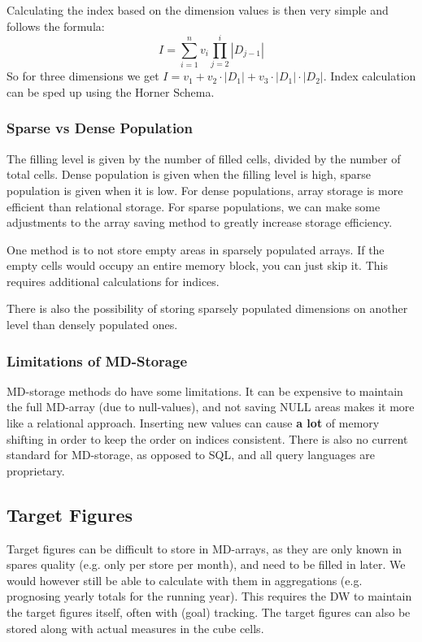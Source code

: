 \documentclass{article}
\begin{document}
Calculating the index based on the dimension values is then very simple and follows the formula:
\begin{equation}
    I = \sum_{i=1}^n v_i \prod_{j=2}^i |D_{j-1}|
\end{equation}
So for three dimensions we get $I = v_1 + v_2 \cdot |D_1| + v_3 \cdot |D_1| \cdot |D_2|$.
Index calculation can be sped up using the Horner Schema.

\subsubsection{Sparse vs Dense Population}
The filling level is given by the number of filled cells, divided by the number of total cells.
Dense population is given when the filling level is high, sparse population is given when it is low.
For dense populations, array storage is more efficient than relational storage.
For sparse populations, we can make some adjustments to the array saving method to greatly increase storage efficiency.

One method is to not store empty areas in sparsely populated arrays.
If the empty cells would occupy an entire memory block, you can just skip it.
This requires additional calculations for indices.

There is also the possibility of storing sparsely populated dimensions on another level than densely populated ones.

\subsubsection{Limitations of MD-Storage}
MD-storage methods do have some limitations.
It can be expensive to maintain the full MD-array (due to null-values), and not saving NULL areas makes it more like a relational approach.
Inserting new values can cause \textbf{a lot} of memory shifting in order to keep the order on indices consistent.
There is also no current standard for MD-storage, as opposed to SQL, and all query languages are proprietary.

\subsection{Target Figures}
Target figures can be difficult to store in MD-arrays, as they are only known in spares quality (e.g. only per store per month), and need to be filled in later.
We would however still be able to calculate with them in aggregations (e.g. prognosing yearly totals for the running year).
This requires the DW to maintain the target figures itself, often with (goal) tracking.
The target figures can also be stored along with actual measures in the cube cells.
\end{document}
